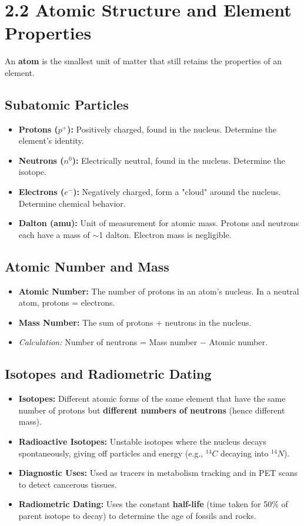 \documentclass[11pt, a4paper]{article}
\begin{document}
\section*{2.2 Atomic Structure and Element Properties}
An \textbf{atom} is the smallest unit of matter that still retains the properties of an element.

\subsection*{Subatomic Particles}
\begin{itemize}
    \item \textbf{Protons ($p^+$):} Positively charged, found in the nucleus. Determine the element's identity.
    \item \textbf{Neutrons ($n^0$):} Electrically neutral, found in the nucleus. Determine the isotope.
    \item \textbf{Electrons ($e^-$):} Negatively charged, form a "cloud" around the nucleus. Determine chemical behavior.
    \item \textbf{Dalton (amu):} Unit of measurement for atomic mass. Protons and neutrons each have a mass of $\sim$1 dalton. Electron mass is negligible.
\end{itemize}

\subsection*{Atomic Number and Mass}
\begin{itemize}
    \item \textbf{Atomic Number:} The number of protons in an atom's nucleus. In a neutral atom, protons = electrons.
    \item \textbf{Mass Number:} The sum of protons + neutrons in the nucleus. 
    \item \textit{Calculation:} Number of neutrons = Mass number $-$ Atomic number.
\end{itemize}

\subsection*{Isotopes and Radiometric Dating}
\begin{itemize}
    \item \textbf{Isotopes:} Different atomic forms of the same element that have the same number of protons but \textbf{different numbers of neutrons} (hence different mass).
    \item \textbf{Radioactive Isotopes:} Unstable isotopes where the nucleus decays spontaneously, giving off particles and energy (e.g., $^{14}C$ decaying into $^{14}N$).
    \item \textbf{Diagnostic Uses:} Used as tracers in metabolism tracking and in PET scans to detect cancerous tissues.
    \item \textbf{Radiometric Dating:} Uses the constant \textbf{half-life} (time taken for 50\% of parent isotope to decay) to determine the age of fossils and rocks.
\end{itemize}
\end{document}
